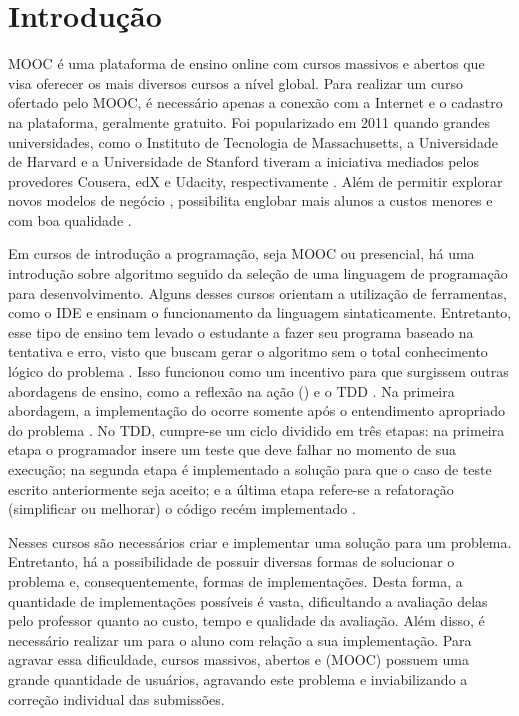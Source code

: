 \chapter{Introdução}

	\ac{MOOC} é uma plataforma de ensino online
	com cursos massivos e abertos que visa oferecer os mais diversos cursos a nível
	global. Para realizar um curso ofertado pelo \acs{MOOC}, é necessário apenas a conexão
	com a Internet e o cadastro na plataforma, geralmente gratuito. Foi popularizado
	em 2011 quando grandes universidades, como o Instituto de Tecnologia de
	Massachusetts, a Universidade de Harvard e a Universidade de Stanford tiveram
	a iniciativa mediados pelos provedores Cousera, edX e Udacity, respectivamente
	\cite{Mehlenbacher:2012}. Além de permitir explorar novos modelos de negócio
	\cite{dellarocas2013money}, possibilita englobar mais alunos a custos menores
	e com boa qualidade \cite{schmidt2013producing}.
	
	Em cursos de introdução a programação, seja \acs{MOOC} ou presencial, há uma introdução
	sobre algoritmo seguido da seleção de uma linguagem de programação para
	desenvolvimento. Alguns desses cursos orientam a utilização de ferramentas, como
	o \ac{IDE} e ensinam o funcionamento da linguagem sintaticamente.
	Entretanto, esse tipo de ensino tem levado o estudante a fazer seu programa baseado
	na tentativa e erro, visto que buscam gerar o algoritmo sem o total conhecimento
	lógico do problema \cite{edwards2003}. Isso funcionou como um incentivo para que
	surgissem outras abordagens de ensino, como a reflexão na ação () e o \ac{TDD} \cite{camara_graciottoSilva2016}. Na primeira abordagem, a
	implementação do  ocorre somente após o entendimento apropriado
	do problema \cite{edwards2004}. No \acs{TDD}, cumpre-se um ciclo dividido em três etapas:
	na primeira etapa o programador insere um teste que deve falhar no momento de sua
	execução; na segunda etapa é implementado a solução para que o caso de teste
	escrito anteriormente seja aceito; e a última etapa refere-se a refatoração
	(simplificar ou melhorar) o código recém implementado \cite{beck2003}.
	
	Nesses cursos são necessários criar e implementar uma solução para um problema.
	Entretanto, há a possibilidade de possuir diversas formas de solucionar o problema
	e, consequentemente, formas de implementações. Desta forma, a quantidade de
	implementações possíveis é vasta, dificultando a avaliação delas pelo professor
	quanto ao custo, tempo e qualidade da avaliação. Além disso, é necessário realizar
	um  para o aluno com relação a sua implementação. Para agravar
	essa dificuldade, cursos massivos, abertos e  (MOOC) possuem uma
	grande quantidade de usuários, agravando este problema e inviabilizando a correção
	individual das submissões.

